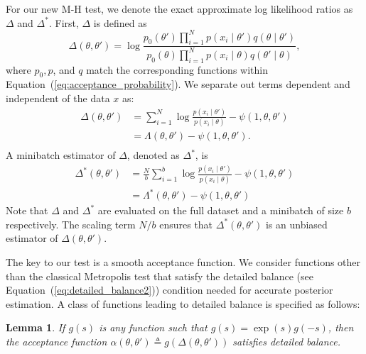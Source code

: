 \documentclass[twoside]{article} \usepackage{aistats2017}
\newtheorem{lemma}{Lemma}
\begin{document}
For our new M-H test, we denote the exact approximate log likelihood ratios
as $\Delta$ and $\Delta^*$.  First, $\Delta$ is defined as
\begin{equation}\label{eq:delta1}
    \Delta(\theta,\theta')  =
    \log \frac{p_0(\theta')\prod_{i=1}^N p(x_i \mid \theta')q(\theta \mid
    \theta')}{p_0(\theta)\prod_{i=1}^N p(x_i \mid \theta)q(\theta' \mid\theta)},
\end{equation}
where $p_0, p$, and $q$ match the corresponding functions within
Equation~(\ref{eq:acceptance_probability}). We separate out terms dependent and
independent of the data $x$ as:
\begin{equation}\label{eq:delta2}
\begin{split}
    \Delta(\theta,\theta') &= \sum_{i=1}^N\log\frac{p(x_i\mid\theta')}{p(x_i\mid\theta)} - \psi(1,\theta,\theta') \\
    & = \Lambda(\theta,\theta') - \psi(1,\theta,\theta'). \\
\end{split}
\end{equation}
A minibatch estimator of $\Delta$, denoted as $\Delta^*$, is
\begin{equation}\label{eq:delta3}
\begin{split}
    \Delta^*(\theta,\theta') &=
\frac{N}{b}\sum_{i=1}^b\log\frac{p(x_i\mid\theta')}{p(x_i\mid\theta)} - \psi(1,\theta,\theta')\\
&=\Lambda^*(\theta,\theta') - \psi(1,\theta,\theta')
\end{split}
\end{equation}
Note that $\Delta$ and $\Delta^*$ are evaluated on the full dataset and a
minibatch of size $b$ respectively. The scaling term $N/b$ ensures that
$\Delta^*(\theta,\theta')$ is an unbiased estimator of $\Delta(\theta,\theta')$.

The key to our test is a smooth acceptance function.  We consider functions
other than the classical Metropolis test that satisfy the detailed balance (see
Equation~(\ref{eq:detailed_balance2})) condition needed for accurate posterior
estimation. A class of functions leading to detailed balance is specified as
follows:

\begin{lemma}\label{lem:detailed_balance}
    If $g(s)$ is any function such that $g(s) = \exp(s) g(-s)$, then the
    acceptance function $\alpha(\theta,\theta') \triangleq
    g(\Delta(\theta,\theta'))$ satisfies detailed balance.
\end{lemma}
\end{document}
